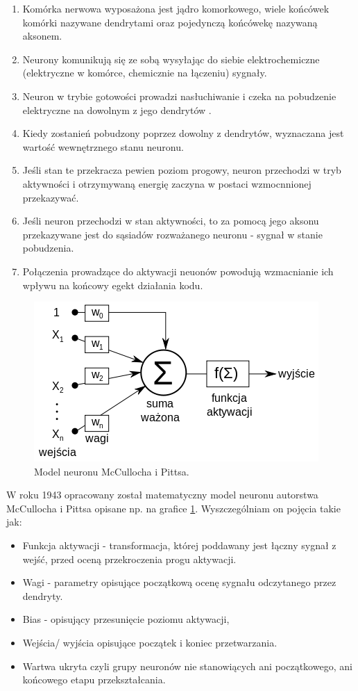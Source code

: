\documentclass[10pt,a4paper]{book}
\begin{document}
\begin{enumerate}
\item Komórka nerwowa wyposażona jest jądro komorkowego, wiele końcówek komórki nazywane dendrytami oraz pojedynczą końcówekę nazywaną aksonem.
\item Neurony komunikują się ze sobą wysyłając do siebie elektrochemiczne (elektryczne w komórce, chemicznie na łączeniu) sygnały.
\item Neuron w trybie gotowości prowadzi nasłuchiwanie i czeka na pobudzenie elektryczne na dowolnym z jego dendrytów . 
\item Kiedy zostanień pobudzony poprzez dowolny z dendrytów, wyznaczana jest wartość wewnętrznego stanu neuronu.
\item Jeśli stan te przekracza pewien poziom progowy, neuron przechodzi w tryb aktywności i otrzymywaną energię zaczyna w postaci wzmocnnionej przekazywać.
\item Jeśli neuron przechodzi w stan aktywności, to za pomocą jego aksonu przekazywane jest do sąsiadów rozważanego neuronu - sygnał w stanie pobudzenia.
\item Połączenia prowadzące do aktywacji neuonów powodują wzmacnianie ich wpływu na końcowy egekt działania kodu.
\end{enumerate}

\begin{figure}
\centering 
\includegraphics[scale=0.5]{images/model_neuronu.png}
\caption{Model neuronu McCullocha i Pittsa.} \label{fig.chapter.predictions.neuron.model}
\end{figure}

W roku 1943 opracowany został matematyczny model neuronu autorstwa  McCullocha i Pittsa opisane np. na grafice \ref{fig.chapter.predictions.neuron.model}. Wyszczególniam on pojęcia takie jak:
\begin{itemize}
\item Funkcja aktywacji - transformacja, której poddawany jest łączny sygnał z wejść, przed oceną przekroczenia progu aktywacji.  
\item Wagi - parametry opisujące początkową ocenę sygnału odczytanego przez dendryty.
\item Bias - opisujący przesunięcie poziomu aktywacji,
\item Wejścia/ wyjścia opisujące początek i koniec przetwarzania.
\item Wartwa ukryta czyli grupy neuronów nie stanowiących ani początkowego, ani końcowego etapu przekształcania. 
\end{itemize}
\end{document}

